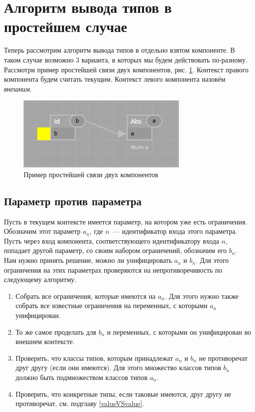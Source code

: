 \section{Алгоритм вывода типов в простейшем случае}
Теперь рассмотрим алгоритм вывода типов в отдельно взятом компоненте. В таком случае возможно 3 варианта, в которых мы будем действовать по-разному. Рассмотри пример простейшей связи двух компонентов, рис. \ref{connection}. Контекст правого компонента будем считать текущим. Контекст левого компонента назовём \textit{внешним}.
\begin{figure}
\centering
\includegraphics{img/connection.PNG}
\caption{Пример простейшей связи двух компонентов}\label{connection}
\end{figure}
\subsection{Параметр против параметра}
Пусть в текущем контексте имеется параметр, на котором уже есть ограничения. Обозначим этот параметр $a_n$, где $n$~--- идентификатор входа этого параметра. Пусть через вход компонента, соответствующего идентификатору входа $n$, попадает другой параметр, со своим набором ограничений, обозначим его $b_n$. Нам нужно принять решение, можно ли унифицировать $a_n$ и $b_n$. Для этого ограничения на этих параметрах проверяются на непротиворечивость по следующему алгоритму.
\begin{enumerate}
	\item Собрать все ограничения, которые имеются на $a_n$. Для этого нужно также собрать все известные ограничения на переменных, с которыми $a_n$ унифицирован.
	\item То же самое проделать для $b_n$ и переменных, с которыми он унифицирован во внешнем контексте.
	\item Проверить, что классы типов, которым принадлежат $a_n$ и $b_n$ не противоречат друг другу (если они имеются). Для этого множество классов типов $b_n$ должно быть подмножеством классов типов $a_n$.
	\item Проверить, что конкретные типы, если таковые имеются, друг другу не противоречат, см. подглаву \ref{valueVSvalue}.
\end{enumerate}
